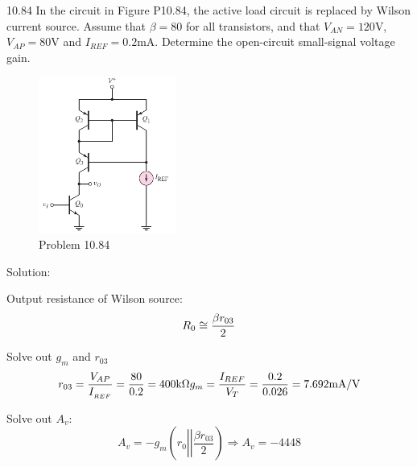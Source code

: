 \documentclass[a4paper,11pt,UTF8]{article}
\begin{document}
10.84 In the circuit in Figure P10.84, the active load circuit is replaced by Wilson current source. Assume that $\beta=80$ for all transistors, and that $V_{AN}=120$V, $V_{AP}=80$V and $I_{REF}= 0.2$mA. Determine the open-circuit small-signal voltage gain.
\begin{figure}[H]
	\centering
	\includegraphics[width=0.4\textwidth]{10.84}
	\caption{Problem 10.84}
\end{figure}
\noindent Solution:
	
Output resistance of Wilson source:
$$
	R_{0}\cong  \frac{\beta{r}_{03}}2  \\
$$

Solve out $g_m$ and $r_{03}$
$$
	r_{03}={\frac{V_{AP}}{I_{_{REF}}}}={\frac{80}{0.2}}=400\mathrm{k}\Omega   \\
	g_{m} =\frac{I_{REF}}{V_{T}}=\frac{0.2}{0.026}=7.692\mathrm{mA/V}  \\
$$

Solve out $A_v$:
$$
	A_{v} =-g_{m}\left(r_{0}\left|\left| \frac{\beta{r}_{03}}2\right.\right.\right)\Rightarrow{A_{v}=-4448} 
$$
\end{document}
